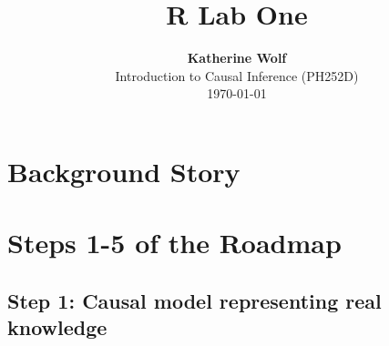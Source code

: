 \documentclass{article}\usepackage[]{graphicx}\usepackage[]{xcolor}
\title{\textbf{R Lab One}}
\author{\textbf{Katherine Wolf}\\ Introduction to Causal Inference (PH252D)\\ \today}
\date{}
\begin{document}
\maketitle

\section{Background Story}

\section{Steps 1-5 of the Roadmap}

  \subsection{Step 1: Causal model representing real knowledge}
  
\end{document}

